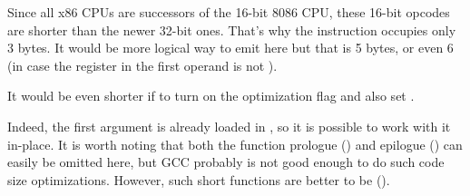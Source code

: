 Since all x86 CPUs are successors of the 16-bit 8086 CPU, these  16-bit opcodes are shorter 
than the newer 32-bit ones.
That's why the  instruction occupies only 3 bytes.
It would be more logical way to emit here 
but that is 5 bytes, or even 6
(in case the register in the first operand is not \EAX).


It would be even shorter if to turn on the \Othree optimization flag and also set .




Indeed, the first argument is already loaded in \EAX, so it is possible to work with it in-place.
It is worth noting that both the function prologue () and epilogue ()
can easily be omitted here, but GCC probably is not good enough to do such code size optimizations.
However, such short functions are better to be  ().
